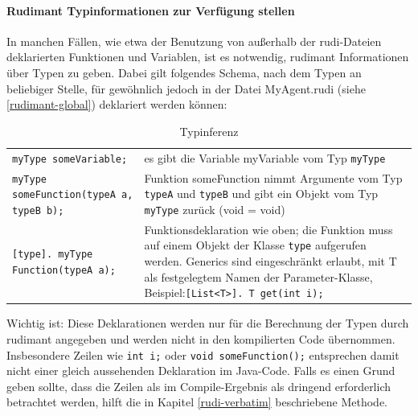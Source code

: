\paragraph{Rudimant Typinformationen zur Verfügung stellen}

In manchen Fällen, wie etwa der Benutzung von außerhalb der rudi-Dateien
deklarierten Funktionen und Variablen, ist es notwendig, rudimant Informationen
über Typen zu geben. Dabei gilt folgendes Schema, nach dem Typen an beliebiger
Stelle, für gewöhnlich jedoch in der Datei MyAgent.rudi (siehe
\ref{rudimant-global}) deklariert werden können:


\begin{table}[htbp]
  \centering
  \small
  \begin{tabular}{lp{}}
    \texttt{myType someVariable;}
    &  es gibt die Variable myVariable vom Typ \texttt{myType} \\

    \texttt{myType someFunction(typeA a, typeB b);}
    &  Funktion someFunction nimmt Argumente vom Typ \texttt{typeA} und
      \texttt{typeB} und gibt ein Objekt vom Typ \texttt{myType} zurück (void =
      void) \\

    \texttt{[type]. myType Function(typeA a);}
    & Funktionsdeklaration wie oben; die Funktion muss auf einem Objekt der
      Klasse \texttt{type} aufgerufen werden. Generics sind eingeschränkt
      erlaubt, mit T als festgelegtem Namen der Parameter-Klasse,
      Beispiel:\newline\texttt{[List<T>]. T get(int i);}
  \end{tabular}

  \caption{Typinferenz}
  \label{tab:typeinference}
\end{table}

Wichtig ist: Diese Deklarationen werden nur für die Berechnung der Typen durch
rudimant angegeben und werden nicht in den kompilierten Code
übernommen. Insbesondere Zeilen wie \texttt{int i;} oder \texttt{void
  someFunction();} entsprechen damit nicht einer gleich aussehenden Deklaration
im Java-Code. Falls es einen Grund geben sollte, dass die Zeilen als im
Compile-Ergebnis als dringend erforderlich betrachtet werden, hilft die in
Kapitel \ref{rudi-verbatim} beschriebene Methode.


